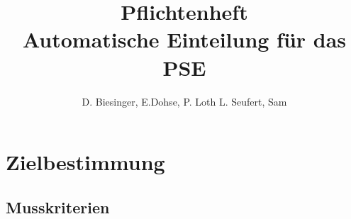 \documentclass[parskip=full]{scrartcl}
\begin{document}
\title{Pflichtenheft \\
        \large Automatische Einteilung für das PSE}

\author{D. Biesinger, E.Dohse, P. Loth L. Seufert, Sam}
        
\maketitle
\vfill

\tableofcontents


\section{Zielbestimmung}


\subsection{Musskriterien}
\end{document}
